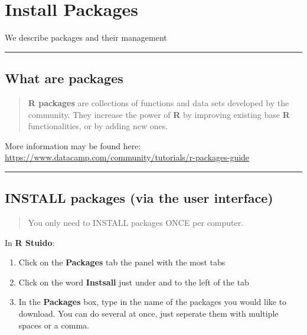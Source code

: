 \documentclass[]{book}
\providecommand{\tightlist}{%
  \setlength{\itemsep}{0pt}\setlength{\parskip}{0pt}}
\theoremstyle{definition}
\theoremstyle{definition}
\theoremstyle{definition}
\theoremstyle{remark}
\begin{document}
\chapter{Install Packages}\label{install-packages}

We describe packages and their management

\begin{center}\rule{0.5\linewidth}{\linethickness}\end{center}

\section{What are packages}\label{what-are-packages}

\begin{quote}
\textbf{R packages} are collections of functions and data sets developed
by the community. They increase the power of \textbf{R} by improving
existing base \textbf{R} functionalities, or by adding new ones.
\end{quote}

More information may be found here:
\url{https://www.datacamp.com/community/tutorials/r-packages-guide}

\begin{center}\rule{0.5\linewidth}{\linethickness}\end{center}

\section{INSTALL packages (via the user
interface)}\label{install-packages-via-the-user-interface}

\begin{quote}
You only need to INSTALL packages ONCE per computer.
\end{quote}

In \textbf{R Stuido}:

\begin{enumerate}
\def\labelenumi{\arabic{enumi}.}
\tightlist
\item
  Click on the \textbf{Packages} tab the panel with the most tabs
\item
  Click on the word \textbf{Instsall} just under and to the left of the
  tab
\item
  In the \textbf{Packages} box, type in the name of the packages you
  would like to download. You can do several at once, just seperate them
  with multiple spaces or a comma.
\end{enumerate}
\end{document}
